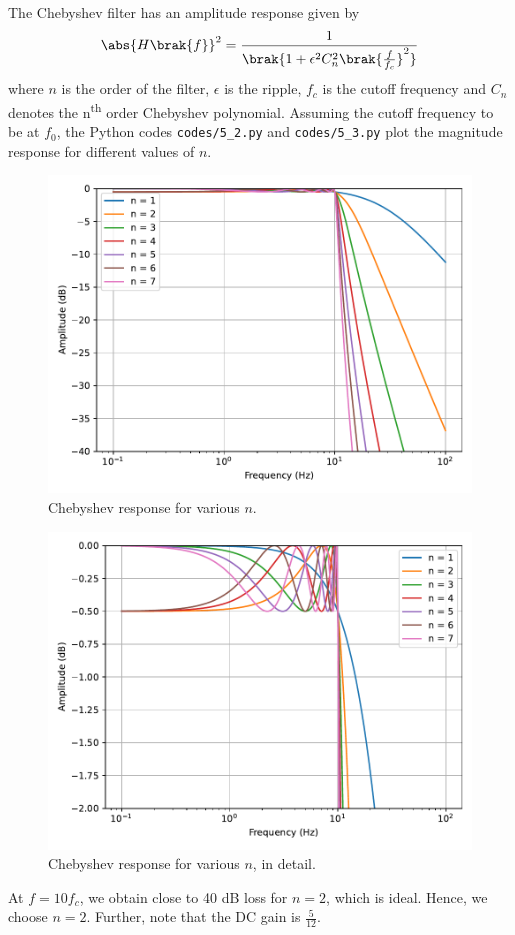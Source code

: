 \documentclass[journal,12pt,twocolumn]{IEEEtran}
\renewcommand\thesection{\arabic{section}}
\begin{document}
\begin{enumerate}[label=\thesection.\arabic*
,ref=\thesection.\theenumi]
\solution The Chebyshev filter has an amplitude response
given by
\begin{align}
    \abs{H\brak{f}}^2 = \frac{1}{\brak{1 + \epsilon^2C_n^2\brak{\frac{f}{f_c}}^2}}
\end{align}
where $n$ is the order of the filter, $\epsilon$ is the
ripple, $f_c$ is the cutoff frequency and $C_n$ denotes 
the n\textsuperscript{th} order Chebyshev polynomial. 
Assuming the cutoff frequency to be at $f_0$, the Python 
codes \texttt{codes/5\_2.py} and \texttt{codes/5\_3.py} plot
the magnitude response for different values of $n$.
\begin{figure}[!ht]
    \includegraphics[width=\columnwidth]{figs/5_2.pdf}
    \caption{Chebyshev response for various $n$.}
    \label{fig:cheby-resp}
\end{figure}
\begin{figure}[!ht]
    \includegraphics[width=\columnwidth]{figs/5_3.pdf}
    \caption{Chebyshev response for various $n$, in detail.}
    \label{fig:cheby-resp-zoom}
\end{figure}
At $f = 10f_c$, we obtain close to 40 dB loss for $n = 2$, 
which is ideal. Hence, we choose $n = 2$. Further, note that
the DC gain is $\frac{5}{12}$.


\end{enumerate}
\end{document}

